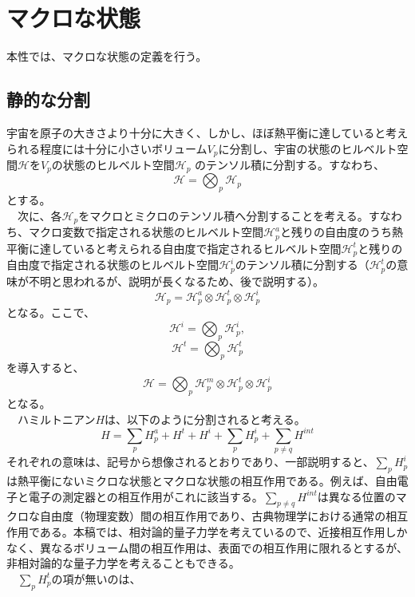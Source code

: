 \section{マクロな状態}
本性では、マクロな状態の定義を行う。
\subsection{静的な分割}
宇宙を原子の大きさより十分に大きく、しかし、ほぼ熱平衡に達していると考えられる程度には十分に小さいボリューム$V_p$に分割し、宇宙の状態のヒルベルト空間$\mathcal{H}$を$V_p$の状態のヒルベルト空間$\mathcal{H}_p$ のテンソル積に分割する。すなわち、
\begin{equation}
    \mathcal{H} = \bigotimes_p \mathcal{H}_p
\end{equation}
とする。\\
　次に、各$\mathcal{H}_p$をマクロとミクロのテンソル積へ分割することを考える。すなわち、マクロ変数で指定される状態のヒルベルト空間$\mathcal{H}_p^a$と残りの自由度のうち熱平衡に達していると考えられる自由度で指定されるヒルベルト空間$\mathcal{H}_p^t$と残りの自由度で指定される状態のヒルベルト空間$\mathcal{H}_p^i$のテンソル積に分割する（$\mathcal{H}_p^t$の意味が不明と思われるが、説明が長くなるため、後で説明する）。
\begin{equation}
    \mathcal{H}_p = \mathcal{H}_p^a \otimes \mathcal{H}_p^t \otimes \mathcal{H}_p^i
\end{equation}
となる。ここで、
\begin{equation}
    \mathcal{H}^i = \bigotimes_p \mathcal{H}_p^i,
\end{equation}
\begin{equation}
    \mathcal{H}^t = \bigotimes_p \mathcal{H}_p^t
\end{equation}
を導入すると、
\begin{equation}
    \mathcal{H} = \bigotimes_p \mathcal{H}_p^m \otimes  \mathcal{H}_p^t \otimes  \mathcal{H}_p^i
\end{equation}
となる。\\
　ハミルトニアン$H$は、以下のように分割されると考える。
\begin{equation}
H=\sum_pH_p^a + H^t + H^i + \sum_p H_p^i + \sum_{p \neq q} H^{int}
\end{equation}
それぞれの意味は、記号から想像されるとおりであり、一部説明すると、$\sum_p H_p^i$は熱平衡にないミクロな状態とマクロな状態の相互作用である。例えば、自由電子と電子の測定器との相互作用がこれに該当する。$\sum_{p \neq q} H^{int}$は異なる位置のマクロな自由度（物理変数）間の相互作用であり、古典物理学における通常の相互作用である。本稿では、相対論的量子力学を考えているので、近接相互作用しかなく、異なるボリューム間の相互作用は、表面での相互作用に限れるとするが、非相対論的な量子力学を考えることもできる。\\
　$\sum_p H_p^t$の項が無いのは、
